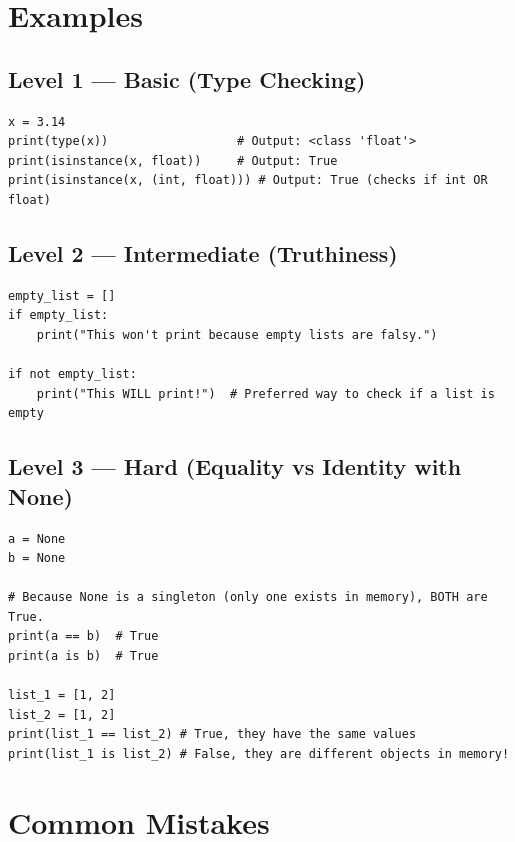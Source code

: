 \section{Examples}

\subsection{Level 1 — Basic (Type Checking)}
\begin{lstlisting}
x = 3.14
print(type(x))                  # Output: <class 'float'>
print(isinstance(x, float))     # Output: True
print(isinstance(x, (int, float))) # Output: True (checks if int OR float)
\end{lstlisting}

\subsection{Level 2 — Intermediate (Truthiness)}
\begin{lstlisting}
empty_list = []
if empty_list:
    print("This won't print because empty lists are falsy.")

if not empty_list:
    print("This WILL print!")  # Preferred way to check if a list is empty
\end{lstlisting}

\subsection{Level 3 — Hard (Equality vs Identity with None)}
\begin{lstlisting}
a = None
b = None

# Because None is a singleton (only one exists in memory), BOTH are True.
print(a == b)  # True
print(a is b)  # True

list_1 = [1, 2]
list_2 = [1, 2]
print(list_1 == list_2) # True, they have the same values
print(list_1 is list_2) # False, they are different objects in memory!
\end{lstlisting}

\section{Common Mistakes}

